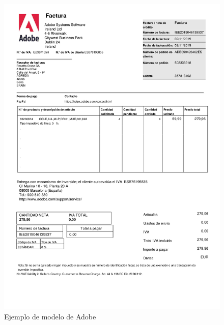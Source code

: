 \begin{figure}[hp!]
	\centering
	\includegraphics[angle=0,height=1.4\textwidth]{imaxes/z-adicional/modelo-adobe}
	\caption{Ejemplo de modelo de Adobe}
	\label{fig:modelo-adobe}
\end{figure}

